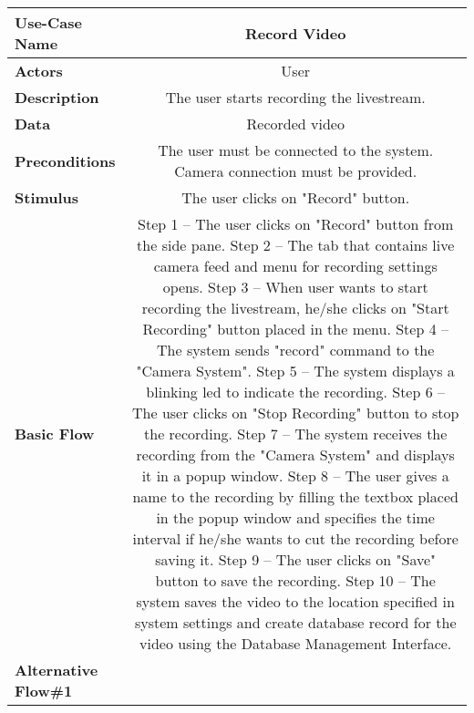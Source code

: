 \begin{table}[H]
     \centering
     \begin{tabular}{|l|C|}
         \hline
          \textbf{Use-Case Name} & Record Video \\
         \hline
          \textbf{Actors} & User \\ 
         \hline
          \textbf{Description} & The user starts recording the livestream. \\ 
         \hline
          \textbf{Data} & Recorded video\\ 
         \hline
          \textbf{Preconditions} & 
		  The user must be connected to the system. \newline
		  Camera connection must be provided. \\
         \hline
          \textbf{Stimulus} & The user clicks on "Record" button.\\ 
         \hline
          \textbf{Basic Flow} & 
          Step 1 -- The user clicks on "Record" button from the side pane. \newline
          Step 2 -- The tab that contains live camera feed and menu for recording settings opens. \newline
          Step 3 -- When user wants to start recording the livestream, he/she clicks on "Start Recording" button placed in the menu. \newline
          Step 4 -- The system sends "record" command to the "Camera System". \newline
          Step 5 -- The system displays a blinking led to indicate the recording. \newline
          Step 6 -- The user clicks on "Stop Recording" button to stop the recording. \newline
          Step 7 -- The system receives the recording from the "Camera System" and displays it in a popup window. \newline
          Step 8 -- The user gives a name to the recording by filling the textbox placed in the popup window and specifies the time interval if he/she wants to cut the recording before saving it. \newline
		  Step 9 -- The user clicks on "Save" button to save the recording. \newline
		  Step 10 -- The system saves the video to the location specified in system settings and create database record for the video using the Database Management Interface. \\
         \hline
          \textbf{Alternative Flow\#1} & 

\end{tabular}
\end{table}
